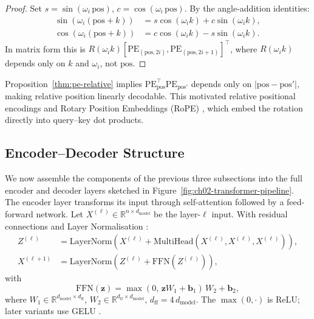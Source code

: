 \begin{deepdive}
\begin{proof}
Set $s = \sin(\omega_i\,\mathrm{pos})$, $c = \cos(\omega_i\,\mathrm{pos})$.
By the angle-addition identities:
\begin{align*}
  \sin(\omega_i(\mathrm{pos}+k)) &= s\cos(\omega_i k) + c\sin(\omega_i k),\\
  \cos(\omega_i(\mathrm{pos}+k)) &= c\cos(\omega_i k) - s\sin(\omega_i k).
\end{align*}
In matrix form this is
$R(\omega_i k)[\mathrm{PE}_{(\mathrm{pos},2i)},\mathrm{PE}_{(\mathrm{pos},2i+1)}]^\top$,
where $R(\omega_i k)$ depends only on $k$ and $\omega_i$, not $\mathrm{pos}$.
\end{proof}

Proposition~\ref{thm:pe-relative} implies
$\mathrm{PE}_{\mathrm{pos}}^\top\mathrm{PE}_{\mathrm{pos}'}$ depends only on
$|\mathrm{pos}-\mathrm{pos}'|$, making relative position linearly decodable.
This motivated relative positional encodings \cite{shaw2018relative} %
and Rotary Position Embeddings (RoPE) \cite{su2024rope}, %
which embed the rotation directly into query--key dot products.

\subsection{Encoder--Decoder Structure}
\label{sec:transformer-encdec}

We now assemble the components of the previous three subsections into the full
encoder and decoder layers sketched in Figure~\ref{fig:ch02-transformer-pipeline}.
The encoder layer transforms its input through self-attention followed by a feed-forward network. Let $X^{(\ell)} \in \mathbb{R}^{n \times d_{\mathrm{model}}}$ be the layer-$\ell$ input.
With residual connections \cite{he2016resnet} %
and Layer Normalisation \cite{ba2016layernorm}: %
\begin{align}
  Z^{(\ell)}   &= \mathrm{LayerNorm}\!\left(
    X^{(\ell)} +
    \mathrm{MultiHead}(X^{(\ell)}, X^{(\ell)}, X^{(\ell)})\right),
  \label{eq:enc-layer-z}\\
  X^{(\ell+1)} &= \mathrm{LayerNorm}\!\left(
    Z^{(\ell)} + \mathrm{FFN}(Z^{(\ell)})\right),
  \label{eq:enc-layer-out}
\end{align}
with
\begin{equation}
  \mathrm{FFN}(\mathbf{z})
  = \max(0,\, \mathbf{z} W_1 + \mathbf{b}_1)\,W_2 + \mathbf{b}_2,
  \label{eq:ffn}
\end{equation}
where $W_1 \in \mathbb{R}^{d_{\mathrm{model}} \times d_{\mathrm{ff}}}$,
$W_2 \in \mathbb{R}^{d_{\mathrm{ff}} \times d_{\mathrm{model}}}$,
$d_{\mathrm{ff}} = 4\,d_{\mathrm{model}}$.
The $\max(0,\cdot)$ is ReLU; later variants use GELU \cite{hendrycks2016gelu}. %


\end{deepdive}
